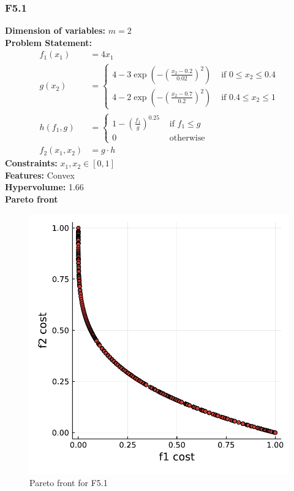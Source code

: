 \documentclass[11pt,oneside,onecolumn,openright]{article}
\begin{document}
   \subsubsection{F5.1~\cite{audet2008multiobjective}}
     \textbf{Dimension of variables: }$m=2$\\
  \noindent\textbf{Problem Statement: }
  \begin{equation}
  \begin{aligned}
  f_1(x_1) &= 4x_1 \\
  g\left(x_{2}\right)&= \begin{cases}4-3 \exp \left(-(\frac{x_{2}-0.2}{0.02})^{2}\right) & \text { if } 0 \leq x_{2} \leq 0.4 \\ 4-2 \exp \left(-(\frac{x_{2}-0.7}{0.2})^{2}\right) & \text { if } 0.4 \leq x_{2} \leq 1\end{cases}\\
  h\left(f_{1}, g\right)&= \begin{cases}1 -\left(\frac{f_{1}}{g}\right)^{0.25} & \text { if } f_{1} \leq g \\ 0 & \text { otherwise }\end{cases}\\
  f_2(x_{1}, x_{2})&=g\cdot h
  \end{aligned}
  \end{equation}
  \noindent\textbf{Constraints: } $x_{1}, x_{2} \in[0,1]$\\
  \noindent\textbf{Features: } Convex\\
  \noindent\textbf{Hypervolume: } 1.66\\
  \noindent\textbf{Pareto front}
      \begin{figure}[H]
      \centering
      \includegraphics[width=12cm]{fig/cvx2.pdf}
      \cprotect\caption{Pareto front for F5.1}
      \end{figure}
\end{document}
